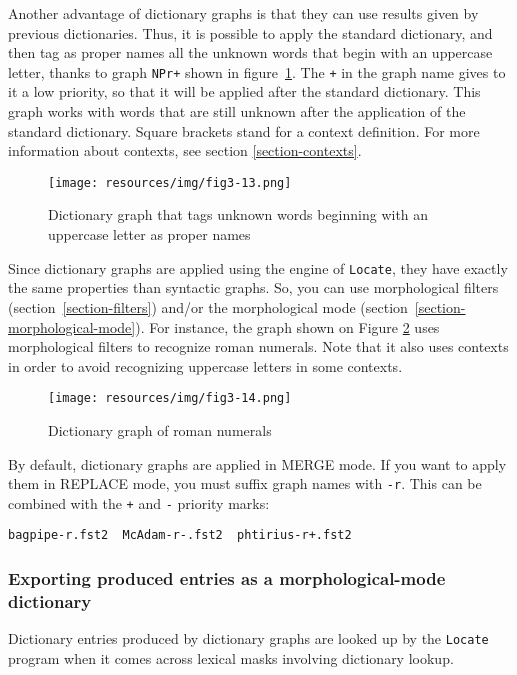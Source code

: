 \bigskip
\noindent Another advantage of dictionary graphs is that they can use results
given by previous dictionaries. Thus, it is possible to apply the standard dictionary, and then tag as proper
names all the unknown words that begin with an uppercase letter, thanks to
graph \verb$NPr+$ shown in figure~\ref{graph-NPr}. The \verb$+$ in the graph
name gives to it a low priority, so that it will be applied after the standard
dictionary. This graph works with words that are still unknown after the
application of the standard dictionary. Square brackets stand for a context definition.
For more information about contexts, see section
\ref{section-contexts}.

\begin{figure}[!ht]
\begin{center}
\texttt{[image: resources/img/fig3-13.png]}
\caption{Dictionary graph that tags unknown words beginning with an uppercase letter as proper names\label{graph-NPr}}
\end{center}
\end{figure}

\noindent Since dictionary graphs are applied using the engine of \verb+Locate+,
they have exactly the same properties than syntactic graphs. So,
you can use morphological filters (section~\ref{section-filters})
and/or the morphological mode (section~\ref{section-morphological-mode}).
For instance, the
graph shown on Figure \ref{graph-CR} uses morphological filters to recognize
roman numerals. Note that it also uses contexts in order to avoid recognizing 
uppercase letters in some contexts.

\begin{figure}[!p]
\begin{center}
\texttt{[image: resources/img/fig3-14.png]}
\caption{Dictionary graph of roman numerals\label{graph-CR}}
\end{center}
\end{figure}

\bigskip
\noindent By default, dictionary graphs are applied in MERGE mode. If you want
to apply them in REPLACE mode, you must suffix graph names with \verb+-r+. This can
be combined with the \verb-+- and \verb+-+ priority marks:

\bigskip
\verb?bagpipe-r.fst2  McAdam-r-.fst2  phtirius-r+.fst2?

\subsubsection{Exporting produced entries as a morphological-mode dictionary}
Dictionary entries produced by dictionary graphs are looked up 
by the \verb+Locate+ program when it comes across lexical masks involving dictionary lookup.

